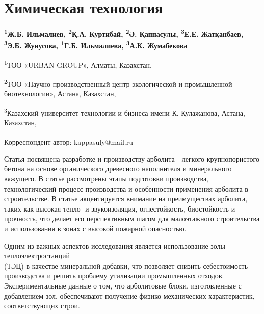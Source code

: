 \let\cleardoublepage\clearpage
\chapter{Химическая технология}

\begin{articleheader}

{\bfseries
\textsuperscript{1}Ж.Б. Ильмалиев,
\textsuperscript{2}Қ.А. Куртибай,
\textsuperscript{2}Ә. Қаппасулы\textsuperscript{\envelope },
\textsuperscript{3}Е.Е. Жатқанбаев,
\textsuperscript{3}Э.Б. Жунусова,
\textsuperscript{1}Г.Б. Ильмалиева,
\textsuperscript{3}А.К. Жумабекова
}
\end{articleheader}

\begin{affiliation}
\textsuperscript{1}ТОО «URBAN GROUP», Алматы, Казахстан,

\textsuperscript{2}ТОО «Научно-производственный центр экологической и промышленной биотехнологии», Астана, Казахстан,

\textsuperscript{3}Казахский университет технологии и бизнеса имени К. Кулажанова, Астана, Казахстан,

\raggedright \textsuperscript{\envelope } Корреспондент-автор: kappasuly@mail.ru
\end{affiliation}

Статья посвящена разработке и производству арболита - легкого
крупнопористого бетона на основе органического древесного наполнителя и
минерального вяжущего. В статье рассмотрены этапы подготовки
производства, технологический процесс производства и особенности
применения арболита в строительстве. В статье акцентируется внимание на
преимуществах арболита, таких как высокая тепло- и звукоизоляция,
огнестойкость, биостойкость и прочность, что делает его перспективным
шагом для малоэтажного строительства и использования в зонах с высокой
пожарной опасностью.

Одним из важных аспектов исследования является использование золы
теплоэлектростанций \\(ТЭЦ) в качестве минеральной добавки, что позволяет
снизить себестоимость производства и решить проблему утилизации
промышленных отходов. Экспериментальные данные о том, что арболитовые
блоки, изготовленные с добавлением зол, обеспечивают получение
физико-механических характеристик, соответствующих строи.

